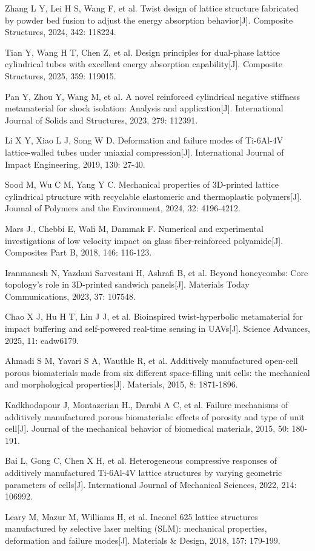 \documentclass{article} %
\begin{document}
\noindent [45] Zhang L Y, Lei H S, Wang F, et al. Twist design of lattice structure fabricated by powder bed fusion to adjust the energy absorption behavior[J]. Composite Structures, 2024, 342: 118224.

\noindent [46] Tian Y, Wang H T, Chen Z, et al. Design principles for dual-phase lattice cylindrical tubes with excellent energy absorption capability[J]. Composite Structures, 2025, 359: 119015.

\noindent [47] Pan Y, Zhou Y, Wang M, et al. A novel reinforced cylindrical negative stiffness metamaterial for shock isolation: Analysis and application[J]. International Journal of Solids and Structures, 2023, 279: 112391.

\noindent [48] Li X Y, Xiao L J, Song W D. Deformation and failure modes of Ti-6Al-4V lattice-walled tubes under uniaxial compression[J]. International Journal of Impact Engineering, 2019, 130: 27-40.

\noindent [49] Sood M, Wu C M, Yang Y C. Mechanical properties of 3D-printed lattice cylindrical ptructure with recyclable elastomeric and thermoplastic polymers[J]. Joumal of Polymers and the Environment, 2024, 32: 4196-4212.

\noindent [50] Mars J., Chebbi E, Wali M, Dammak F. Numerical and experimental investigations of low velocity impact on glass fiber-reinforced polyamide[J]. Composites Part B, 2018, 146: 116-123.

\noindent [51] Iranmanesh N, Yazdani Sarvestani H, Ashrafi B, et al. Beyond honeycombs: Core topology's role in 3D-printed sandwich panels[J]. Materials Today Communications, 2023, 37: 107548.

\noindent [52] Chao X J, Hu H T, Lin J J, et al. Bioinspired twist-hyperbolic metamaterial for impact buffering and self-powered real-time sensing in UAVs[J]. Science Advances, 2025, 11: eadw6179.

\noindent [53] Ahmadi S M, Yavari S A, Wauthle R, et al. Additively manufactured open-cell porous biomaterials made from six different space-filling unit cells: the mechanical and morphological properties[J]. Materials, 2015, 8: 1871-1896.

\noindent [54] Kadkhodapour J, Montazerian H., Darabi A C, et al. Failure mechanisms of additively manufactured porous biomaterials: effects of porosity and type of unit cell[J]. Journal of the mechanical behavior of biomedical materials, 2015, 50: 180-191.

\noindent [55] Bai L, Gong C, Chen X H, et al. Heterogeneous compressive responses of additively manufactured Ti-6Al-4V lattice structures by varying geometric parameters of cells[J]. International Journal of Mechanical Sciences, 2022, 214: 106992.

\noindent [56] Leary M, Mazur M, Williams H, et al. Inconel 625 lattice structures manufactured by selective laser melting (SLM): mechanical properties, deformation and failure modes[J]. Materials \& Design, 2018, 157: 179-199.
\end{document}
